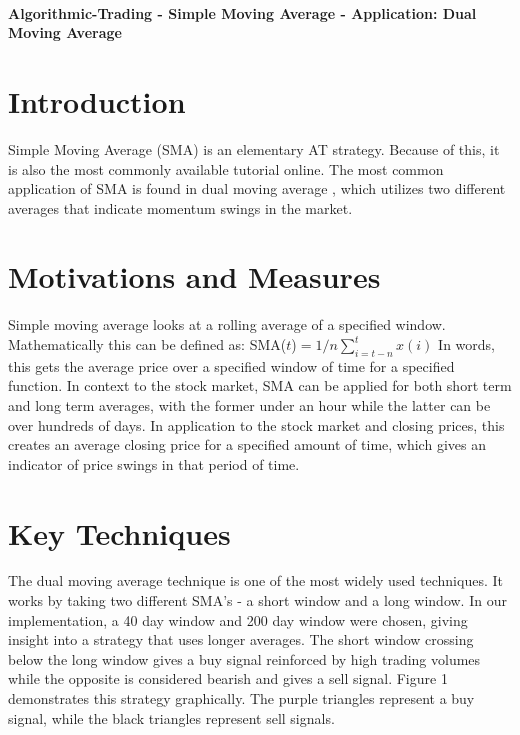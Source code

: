 \documentclass[letterpaper,11pt]{article}
\begin{document}
\thispagestyle{plain}


 \\

\noindent\textbf{Algorithmic-Trading - Simple Moving Average - Application: Dual Moving Average}

\section*{Introduction }

Simple Moving Average (SMA) is an elementary AT strategy. Because of this, it is also the most commonly available tutorial online. The most common application of SMA is found in dual moving average \cite{AlmeidaTeixeira}, which utilizes two different averages that indicate momentum swings in the market.

\section*{Motivations and Measures}

Simple moving average looks at a rolling average of a specified window. Mathematically this can be defined as: SMA($t$)$ = 1/n \sum_{i=t-n}^{t}x(i)$ \cite{AlmeidaTeixeira} In words, this gets the average price over a specified window of time for a specified function. In context to the stock market, SMA can be applied for both short term and long term averages, with the former under an hour while the latter can be over hundreds of days. In application to the stock market and closing prices, this creates an average closing price for a specified amount of time, which gives an indicator of price swings in that period of time.

\section*{Key Techniques}

The dual moving average technique is one of the most widely used techniques. It works by taking two different SMA's - a short window and a long window. In our implementation, a 40 day window and 200 day window were chosen, giving insight into a strategy that uses longer averages. The short window crossing below the long window gives a buy signal reinforced by high trading volumes while the opposite is considered bearish and gives a sell signal. Figure 1 demonstrates this strategy graphically. The purple triangles represent a buy signal, while the black triangles represent sell signals. 
\end{document}
